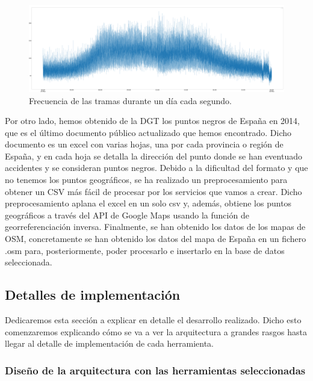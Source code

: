 \begin{figure}[htp]
\centering
\includegraphics[scale=0.26]{Imagenes/graf3.png}
\caption{ Frecuencia de las tramas durante un día cada segundo.}
\label{graf1sec}
\end{figure}

Por otro lado, hemos obtenido de la DGT los puntos negros de España en 2014, que es el último documento público actualizado que hemos encontrado. Dicho documento es un excel con varias hojas, una por cada provincia o región de España, y en cada hoja se detalla la dirección del punto donde se han eventuado accidentes y se consideran puntos negros. Debido a la dificultad del formato y que no tenemos los puntos geográficos, se ha realizado un preprocesamiento para obtener un CSV más fácil de procesar por los servicios que vamos a crear. Dicho preprocesamiento aplana el excel en un solo csv y, además, obtiene los puntos geográficos a través del API de Google Maps usando la función de georreferenciación inversa.
Finalmente, se han obtenido los datos de los mapas de OSM, concretamente se han obtenido los datos del mapa de España en un fichero .osm para, posteriormente, poder procesarlo e insertarlo en la base de datos seleccionada.

\subsection{Detalles de implementación\label{implementacion}}

Dedicaremos esta sección a explicar en detalle el desarrollo realizado. Dicho esto comenzaremos explicando cómo se va a ver la arquitectura a grandes rasgos hasta llegar al detalle de implementación de cada herramienta.

\subsubsection{Diseño de la arquitectura con las herramientas seleccionadas\label{disenio}}

